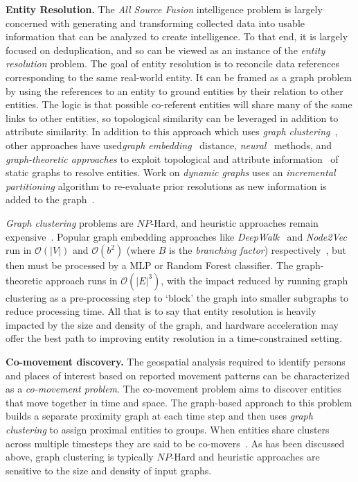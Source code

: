 \textbf{Entity Resolution.}
The \textit{All Source Fusion} intelligence problem is largely concerned with generating and transforming collected data into usable information that can be analyzed to create intelligence. 
To that end, it is largely focused on deduplication, and so can be viewed as an instance of the \textit{entity resolution} problem.
The goal of entity resolution is to reconcile data references corresponding to the same real-world entity. 
It can be framed as a graph problem by using the references to an entity to ground entities by their relation to other entities. The logic is that possible co-referent entities will share many of the same links to other entities, so topological similarity can be leveraged in addition to attribute similarity.
In addition to this approach which uses \textit{graph clustering}~\cite{Bhattacharya2006}, other approaches have used\textit{graph embedding}~\cite{Obraczka2021} distance, \textit{neural}~\cite{Ebraheem2018} methods, and \textit{graph-theoretic approaches} to exploit topological and attribute information~\cite{Zhang2020} of static graphs to resolve entities.
Work on \textit{dynamic graphs} uses an \textit{incremental partitioning} algorithm to re-evaluate prior resolutions as new information is added to the graph~\cite{Tauer2019}.

\textit{Graph clustering} problems are $NP$-Hard, and heuristic approaches remain expensive~\cite{Schaeffer2007}. 
Popular graph embedding approaches like \textit{DeepWalk}~\cite{Perozzi2014} and \textit{Node2Vec}~\cite{Grover2016} run in $\mathcal{O}(|V|)$ and $\mathcal{O}(b^{2})$ (where $B$ is the \textit{branching factor}) respectively~\cite{Pimentel2019}, but then must be processed by a MLP or Random Forest classifier.
The graph-theoretic approach runs in $\mathcal{O}(|E|^{3})$, with the impact reduced by running graph clustering as a pre-processing step to `block' the graph into smaller subgraphs to reduce processing time.
All that is to say that entity resolution is heavily impacted by the size and density of the graph, and hardware acceleration may offer the best path to improving entity resolution in a time-constrained setting. 

\textbf{Co-movement discovery.}
The geospatial analysis required to identify persons and places of interest based on reported movement patterns can be characterized as a \textit{co-movement problem}. 
The co-movement problem aims to discover entities that move together in time and space. 
The graph-based approach to this problem builds a separate proximity graph at each time step and then uses \textit{graph clustering} to assign proximal entities to groups.
When entities share clusters across multiple timesteps they are said to be co-movers~\cite {Tritsarolis2021}.
As has been discussed above, graph clustering is typically $NP$-Hard and heuristic approaches are sensitive to the size and density of input graphs. 


